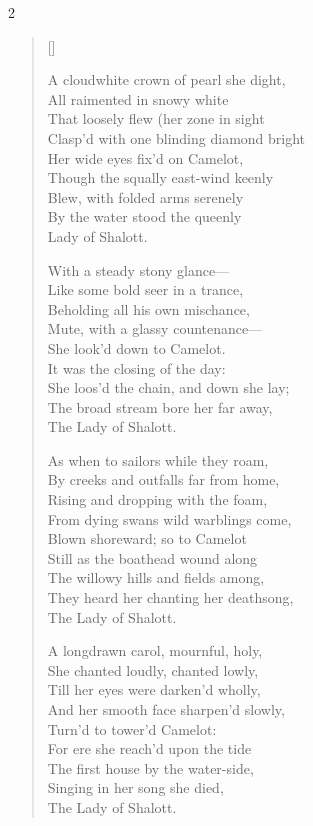 \begin{paracol}{2}
\begin{verse}[\versewidth]
\begin{patverse}
A cloudwhite crown of pearl she dight,\\
All raimented in snowy white\\
That loosely flew (her zone in sight\\
Clasp'd with one blinding diamond bright\\
Her wide eyes fix'd on Camelot,\\
Though the squally east-wind keenly\\
Blew, with folded arms serenely\\
By the water stood the queenly\\
Lady of Shalott.
\end{patverse}

\begin{patverse}
With a steady stony glance—\\
Like some bold seer in a trance,\\
Beholding all his own mischance,\\
Mute, with a glassy countenance—\\
She look'd down to Camelot.\\
It was the closing of the day:\\
She loos'd the chain, and down she lay;\\
The broad stream bore her far away,\\
The Lady of Shalott.
\end{patverse}

\begin{patverse}
As when to sailors while they roam,\\
By creeks and outfalls far from home,\\
Rising and dropping with the foam,\\
From dying swans wild warblings come,\\
Blown shoreward; so to Camelot\\
Still as the boathead wound along\\
The willowy hills and fields among,\\
They heard her chanting her deathsong,\\
The Lady of Shalott.
\end{patverse}

\begin{patverse}
A longdrawn carol, mournful, holy,\\
She chanted loudly, chanted lowly,\\
Till her eyes were darken'd wholly,\\
And her smooth face sharpen'd slowly,\\
Turn'd to tower'd Camelot:\\
For ere she reach'd upon the tide\\
The first house by the water-side,\\
Singing in her song she died,\\
The Lady of Shalott.
\end{patverse}


\end{verse}
\end{paracol}
